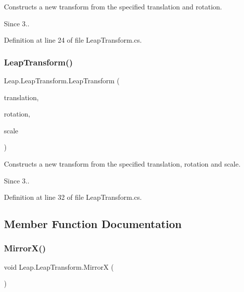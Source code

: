 Constructs a new transform from the specified translation and rotation. 

\begin{DoxySince}{Since}
3.. 
\end{DoxySince}


Definition at line 24 of file Leap\+Transform.\+cs.

\mbox{\label{struct_leap_1_1_leap_transform_a9cb17381736fafcf776c1f5e8b154009}} 
\subsubsection{\texorpdfstring{LeapTransform()}{LeapTransform()}\hspace{0.1cm}{\footnotesize\ttfamily [2/2]}}
{\footnotesize\ttfamily Leap.\+Leap\+Transform.\+Leap\+Transform (\begin{DoxyParamCaption}\item[{\mbox{\hyperlink{struct_leap_1_1_vector}{Vector}}}]{translation,  }\item[{\mbox{\hyperlink{struct_leap_1_1_leap_quaternion}{Leap\+Quaternion}}}]{rotation,  }\item[{\mbox{\hyperlink{struct_leap_1_1_vector}{Vector}}}]{scale }\end{DoxyParamCaption})}



Constructs a new transform from the specified translation, rotation and scale. 

\begin{DoxySince}{Since}
3.. 
\end{DoxySince}


Definition at line 32 of file Leap\+Transform.\+cs.



\subsection{Member Function Documentation}
\mbox{\label{struct_leap_1_1_leap_transform_a1184d7a37a603a07ed15373bb08c8901}} 
\subsubsection{\texorpdfstring{MirrorX()}{MirrorX()}}
{\footnotesize\ttfamily void Leap.\+Leap\+Transform.\+MirrorX (\begin{DoxyParamCaption}{ }\end{DoxyParamCaption})}



